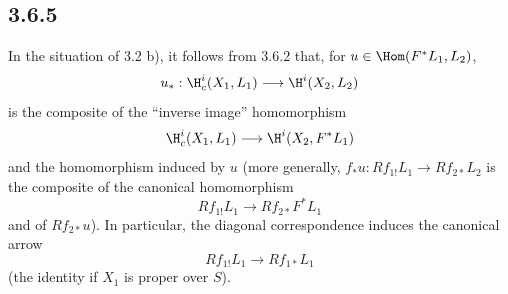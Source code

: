 \subsection*{3.6.5}
In the situation of 3.2 b), it follows from 3.6.2 that, for $u\in\Hom(F^*L_1,L_2)$,
\[
u_*:\H_c^i(X_1,L_1)\longrightarrow \H^i(X_2,L_2)
\]
is the composite of the ``inverse image'' homomorphism
\[
\H_c^i(X_1,L_1)\longrightarrow \H^i(X_2,F^*L_1)
\]
and the homomorphism induced by $u$ (more generally, $f_*u:Rf_{1!}L_1\to Rf_{2*}L_2$ is the composite of the canonical homomorphism
\[
Rf_{1!}L_1\longrightarrow Rf_{2*}F^*L_1
\]
and of $Rf_{2*}u$). In particular, the diagonal correspondence induces the canonical arrow
\[
Rf_{1!}L_1\longrightarrow Rf_{1*}L_1
\]
(the identity if $X_1$ is proper over $S$).


